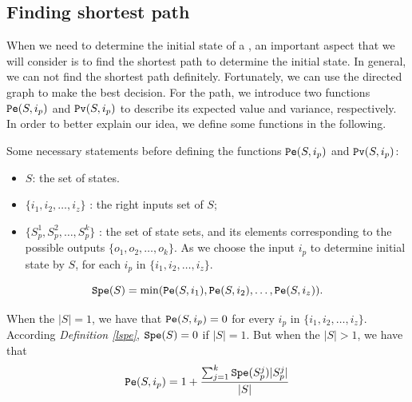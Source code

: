 \subsection{Finding shortest path}
When we need to determine the initial state of a \BCN, an important aspect that we will consider is to find the shortest path to determine the initial state. In general, we can not find the shortest path definitely.  Fortunately, we can use the directed graph to make the best decision. For the path, we introduce two functions $\Pe(S, i_p)$ and ${\tt Pv}(S, i_p)$ to describe its expected value and variance, respectively. In order to better explain our idea, we define some functions in the following.



Some necessary statements before defining the functions $\Pe(S, i_p)$ and ${\tt Pv}(S, i_p)$:
\begin{itemize}
  \item $S$: the set of states.
  \item $\{i_1,i_2,\ldots, i_z\}$ : the right inputs set of $S$;
  \item $\{S_p^1,S_p^2,\ldots, S_p^k\}$ : the set of state sets, and its elements corresponding to the possible outputs $\{o_1,o_2,\ldots,o_k\}$. As we choose the input $i_p$ to determine initial state by $S$, for each $i_p$ in $\{i_1,i_2,\ldots, i_z\}$.
\end{itemize} 
\begin{definition}[$\Spe(S)$] \label{lspe}
 \[{\tt Spe}(S)= \min({\tt Pe}(S, i_1),{\tt Pe}(S, i_2),\ldots,{\tt Pe}(S, i_z)).\] 
\end{definition}

\begin{definition}[$\Pe(S, i_p)$] 
When the $|S|=1$, we have that
${\tt Pe}(S, i_p)=0$  for every $i_p$ in $\{i_1,i_2,\ldots, i_z\}$. According {\em Definition \ref{lspe}}, ${\tt Spe}(S)=0$ if $|S|=1$. But when the $|S|>1$, 
we have that  
\[{\tt Pe}(S, i_p)=1 +\frac{\sum_{j=1}^k {\tt Spe}(S_p^j)|S_p^j|}{ |S|}\] 
\end{definition}

